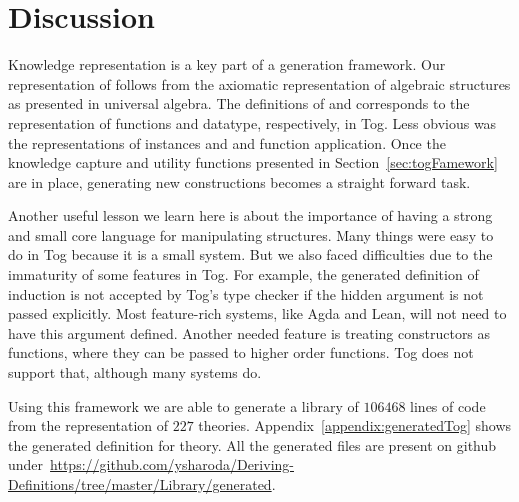 \section{Discussion}
\label{sec:generation:discussion}
Knowledge representation is a key part of a generation framework. Our representation of  follows from the axiomatic representation of algebraic structures as presented in universal algebra. The definitions of  and  corresponds to the representation of functions and datatype, respectively, in Tog. Less obvious was the representations of instances  and  and function application. 
Once the knowledge capture and utility functions presented in Section~\ref{sec:togFamework} are in place, generating new constructions becomes a straight forward task. 

Another useful lesson we learn here is about the importance of having a strong and small core language for manipulating structures. Many things were easy to do in Tog because it is a small system. But we also faced difficulties due to the immaturity of some features in Tog.  
For example, the generated definition of induction is not accepted by Tog's type checker if the hidden argument  is not passed explicitly. Most feature-rich systems, like Agda and Lean, will not need to have this argument defined. Another needed feature is treating constructors as functions, where they can be passed to higher order functions. Tog does not support that, although many systems do.  

Using this framework we are able to generate a library of $106468$ lines of code from the representation of $227$ theories. Appendix~\ref{appendix:generatedTog} shows the generated definition for  theory. All the generated files are present on github under~\url{https://github.com/ysharoda/Deriving-Definitions/tree/master/Library/generated}. 
 
